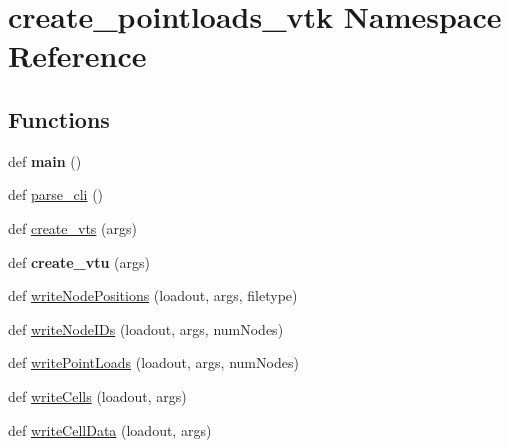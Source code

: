 \hypertarget{namespacecreate__pointloads__vtk}{}\section{create\+\_\+pointloads\+\_\+vtk Namespace Reference}
\label{namespacecreate__pointloads__vtk}
\subsection*{Functions}
\begin{DoxyCompactItemize}
\item 
\hypertarget{namespacecreate__pointloads__vtk_a6ea6d2d37a8d4c688dff97106f96be0d}{}def {\bfseries main} ()\label{namespacecreate__pointloads__vtk_a6ea6d2d37a8d4c688dff97106f96be0d}

\item 
def \hyperlink{namespacecreate__pointloads__vtk_a65c768a8aa5e6fae03ee5aea5ecaf6a9}{parse\+\_\+cli} ()
\item 
def \hyperlink{namespacecreate__pointloads__vtk_a6ecb29d9159ba8d738c2073c7268ac4e}{create\+\_\+vts} (args)
\item 
\hypertarget{namespacecreate__pointloads__vtk_abfe588cef6baa9584990ffb931800fa6}{}def {\bfseries create\+\_\+vtu} (args)\label{namespacecreate__pointloads__vtk_abfe588cef6baa9584990ffb931800fa6}

\item 
def \hyperlink{namespacecreate__pointloads__vtk_a7548d10cb2c8c38cad75c94272d24e93}{write\+Node\+Positions} (loadout, args, filetype)
\item 
def \hyperlink{namespacecreate__pointloads__vtk_a7cf2f65a492550fa8526f4e41f22fb2b}{write\+Node\+I\+Ds} (loadout, args, num\+Nodes)
\item 
def \hyperlink{namespacecreate__pointloads__vtk_af98328e3ca7388c3cf7304f2823060ca}{write\+Point\+Loads} (loadout, args, num\+Nodes)
\item 
def \hyperlink{namespacecreate__pointloads__vtk_ae111dff13abca12198d5862fa7933be9}{write\+Cells} (loadout, args)
\item 
def \hyperlink{namespacecreate__pointloads__vtk_aef22e82908872fba7bb6dc2b4f7c8bdb}{write\+Cell\+Data} (loadout, args)
\end{DoxyCompactItemize}


